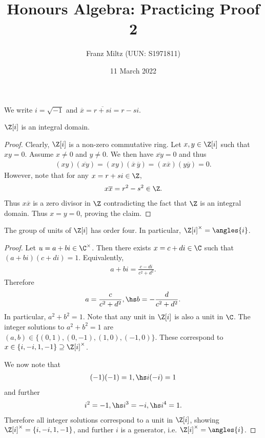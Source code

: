 \documentclass{article}
\begin{document}
\title{Honours Algebra: Practicing Proof 2}
\author{Franz Miltz (UUN: S1971811)}
\date{11 March 2022}
\maketitle
\newcommand{\gaussint}{\Z[i]}
We write $i=\sqrt{-1}$ and $\overline x = \overline{r+si} = r - si$.
\begin{claim*}[1]
	$\Z[i]$ is an integral domain.
	\begin{proof}
		Clearly, $\gaussint$ is a non-zero commutative ring. Let $x,y\in\gaussint$ such that
		$xy=0$. Assume $x\not=0$ and $y\not=0$. We then have $\overline{xy}=0$ and thus
		\begin{align*}
			(xy)(\overline{xy})=(xy)(\overline x\,\overline y)=(x\overline x)(y\overline y) = 0.
		\end{align*}
		However, note that for any $x=r+si\in\Z$,
		\begin{align*}
			x\overline x = r^2-s^2 \in\Z.
		\end{align*}
		Thus $x\overline x$ is a zero divisor in $\Z$ contradicting the fact that $\Z$ is an
		integral domain. Thus $x=y=0$, proving the claim.
	\end{proof}
\end{claim*}

\begin{claim*}[2]
	The group of units of $\gaussint$ has order four. In particular, $\gaussint^\times = \angles{i}$.
	\begin{proof}
		Let $u=a+bi\in\C^\times$. Then there exists $x=c+di\in\C$ such that $(a+bi)(c+di) = 1$.
		Equivalently,
		\begin{align*}
			a+bi = \frac{c-di}{c^2+d^2}.
		\end{align*}
		Therefore
		\begin{align*}
			a = \frac{c}{c^2+d^2},\hs b=-\frac{d}{c^2+d^2}.
		\end{align*}
		In particular, $a^2+b^2=1$. Note that any unit in $\gaussint$ is also a unit in $\C$.
		The integer solutions to $a^2+b^2=1$ are $(a,b)\in\{(0,1),(0,-1),(1,0),(-1,0)\}$.
		These correspond to $x\in\{i,-i,1,-1\}\supseteq\gaussint^\times$.

		We now note that
		\begin{align*}
			(-1)(-1) = 1,\hs i(-i) = 1
		\end{align*}
		and further
		\begin{align*}
			i^2 = -1,\hs i^3 = -i, \hs i^4 = 1.
		\end{align*}
		Therefore all integer solutions correspond to a unit in $\gaussint$, showing
		$\gaussint^\times=\{i,-i,1,-1\}$, and further $i$ is a generator, i.e. $\gaussint^\times=\angles{i}$.
	\end{proof}
\end{claim*}
\end{document}
